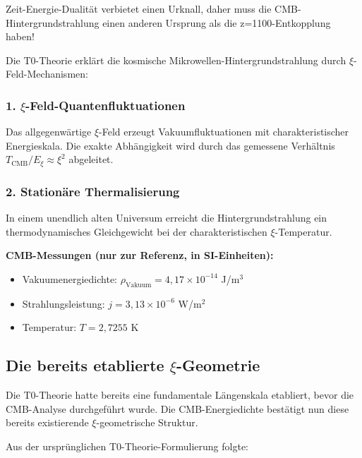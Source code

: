\documentclass[12pt,a4paper]{article}
\begin{document}
	\begin{revolutionary}
		Zeit-Energie-Dualität verbietet einen Urknall, daher muss die CMB-Hintergrundstrahlung einen anderen Ursprung als die z=1100-Entkopplung haben!
	\end{revolutionary}
	
	Die T0-Theorie erklärt die kosmische Mikrowellen-Hintergrundstrahlung durch $\xi$-Feld-Mechanismen:
	
	\subsubsection{1. $\xi$-Feld-Quantenfluktuationen}
	Das allgegenwärtige $\xi$-Feld erzeugt Vakuumfluktuationen mit charakteristischer Energieskala. Die exakte Abhängigkeit wird durch das gemessene Verhältnis $T_{\text{CMB}}/E_\xi \approx \xi^2$ abgeleitet.
	
	\subsubsection{2. Stationäre Thermalisierung}
	In einem unendlich alten Universum erreicht die Hintergrundstrahlung ein thermodynamisches Gleichgewicht bei der charakteristischen $\xi$-Temperatur.
	
	\begin{sibox}
		\textbf{CMB-Messungen (nur zur Referenz, in SI-Einheiten):}
		\begin{itemize}
			\item Vakuumenergiedichte: $\rho_{\text{Vakuum}} = 4,17 \times 10^{-14}$ J/m$^3$
			\item Strahlungsleistung: $j = 3,13 \times 10^{-6}$ W/m$^2$
			\item Temperatur: $T = 2,7255$ K
		\end{itemize}
	\end{sibox}
	
	\subsection{Die bereits etablierte $\xi$-Geometrie}
	
	\begin{important}
		Die T0-Theorie hatte bereits eine fundamentale Längenskala etabliert, bevor die CMB-Analyse durchgeführt wurde. Die CMB-Energiedichte bestätigt nun diese bereits existierende $\xi$-geometrische Struktur.
	\end{important}
	
	Aus der ursprünglichen T0-Theorie-Formulierung folgte:
	
\end{document}
